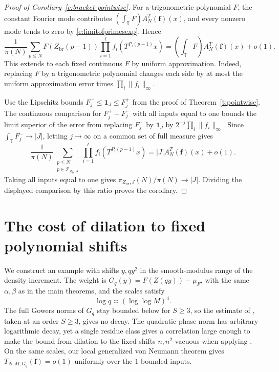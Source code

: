 \documentclass[12pt]{amsart}
\newcommand{\1}{\mathbf 1}
\theoremstyle{definition}
\begin{document}
\begin{proof}[Proof of Corollary~\ref{c:bracket-pointwise}]
For a trigonometric polynomial $F$, the constant Fourier mode
contributes $(\int_{\mathbb T}F)A_N^T(\mathbf f)(x)$, and every
nonzero mode tends to zero by \eqref{e:limitofprimesexp}. Hence
\[
 \frac1{\pi(N)}\sum_{p\leq N}F(Z_{\mathrm{br}}(p-1))
 \prod_{i=1}^{\ell}f_i(T^{P_i(p-1)}x)
 =\left(\int_{\mathbb T}F\right)A_N^T(\mathbf f)(x)+o(1).
\]
This extends to each fixed continuous $F$ by uniform approximation.
Indeed, replacing $F$ by a trigonometric polynomial changes each
side by at most the uniform approximation error times
$\prod_i\|f_i\|_\infty$.

Use the Lipschitz bounds $F_j^-\leq\mathbf1_J\leq F_j^+$ from the
proof of Theorem~\ref{t:pointwise}. The continuous comparison for
$F_j^+-F_j^-$ with all inputs equal to one bounds the limit superior
of the error from replacing $F_j^-$ by $\mathbf1_J$ by
$2^{-j}\prod_i\|f_i\|_\infty$. Since $\int_{\mathbb T}F_j^-\to |J|$,
letting $j\to\infty$ on a common set of full measure gives
\[
 \frac1{\pi(N)}
 \sum_{\substack{p\leq N\\p\in\mathcal P_{Z_{\mathrm{br}},J}}}
 \prod_{i=1}^{\ell}f_i(T^{P_i(p-1)}x)
 = |J|A_N^T(\mathbf f)(x)+o(1).
\]
Taking all inputs equal to one gives
$\pi_{Z_{\mathrm{br}},J}(N)/\pi(N)\to |J|$. Dividing the displayed
comparison by this ratio proves the corollary.
\end{proof}

\appendix

\section{The cost of dilation to fixed polynomial shifts}
\label{s:why-Cq}

We construct an example with shifts $y,qy^2$ in the smooth-modulus
range of the density increment. The weight is
$G_q(y)=F(Z(qy))-\mu_F$, with the same $\alpha,\beta$ as in the
main theorems, and the scales satisfy
$$\log q\asymp(\log\log M)^4.$$
The full Gowers norms of $G_q$ stay bounded below for $S\geq3$,
so the estimate of \cite[Proposition~3.3]{KMTT}, taken at an order
$S\geq3$, gives no decay.
The quadratic-phase norm has arbitrary logarithmic decay, yet
a single residue class gives a correlation large enough to make
the bound from dilation to the fixed shifts $n,n^2$ vacuous
when applying \cite[Theorem~4.1]{Teravainen}. On the same scales,
our local generalized von Neumann theorem gives
$T_{N,M,G_q}(\mathbf f)=o(1)$ uniformly over the $1$-bounded
inputs.
\end{document}
